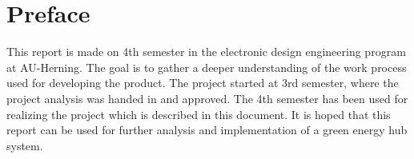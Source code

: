 \section*{Preface}
This report is made on 4th semester in the electronic design engineering program at AU-Herning. The goal is to gather a deeper understanding of the work process used for developing the product. The project started at 3rd semester, where the project analysis was handed in and approved. The 4th semester has been used for realizing the project which is described in this document. 
\p
It is hoped that this report can be used for further analysis and implementation of a green energy hub system.